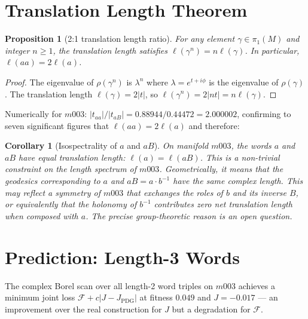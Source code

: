 \documentclass[floatfix,aps,prd,twocolumn,showpacs,superscriptaddress,longbibliography]{revtex4-2}
\newtheorem{proposition}{Proposition}
\newtheorem{corollary}{Corollary}
\begin{document}
\section{Translation Length Theorem}
\label{sec:length}

\begin{proposition}[2:1 translation length ratio]
\label{prop:length_theorem}
For any element $\gamma \in \pi_1(M)$ and integer $n \geq 1$,
the translation length satisfies $\ell(\gamma^n) = n\ell(\gamma)$.
In particular, $\ell(aa) = 2\ell(a)$.
\end{proposition}

\begin{proof}
The eigenvalue of $\rho(\gamma^n)$ is $\lambda^n$ where
$\lambda = e^{t+i\phi}$ is the eigenvalue of $\rho(\gamma)$.
The translation length $\ell(\gamma) = 2|t|$, so
$\ell(\gamma^n) = 2|nt| = n\ell(\gamma)$.
\end{proof}

Numerically for $m003$: $|t_{aa}|/|t_{aB}| = 0.88944/0.44472
= 2.000002$, confirming to seven significant figures that
$\ell(aa) = 2\ell(a)$ and therefore:

\begin{corollary}[Isospectrality of $a$ and $aB$]
\label{cor:isospectral}
On manifold $m003$, the words $a$ and $aB$ have equal
translation length: $\ell(a) = \ell(aB)$.
This is a non-trivial constraint on the length spectrum of $m003$.
Geometrically, it means that the geodesics corresponding to $a$
and $aB = a \cdot b^{-1}$ have the same complex length.
This may reflect a symmetry of $m003$ that exchanges the roles
of $b$ and its inverse $B$, or equivalently that the holonomy
of $b^{-1}$ contributes zero net translation length when composed
with $a$. The precise group-theoretic reason is an open question.
\end{corollary}

\section{Prediction: Length-3 Words}
\label{sec:prediction_scan}

The complex Borel scan over all length-2 word triples on $m003$
achieves a minimum joint loss $\mathcal{F} + c|J - J_{\mathrm{PDG}}|$
at fitness $0.049$ and $J = -0.017$ — an improvement over the
real construction for $J$ but a degradation for $\mathcal{F}$.
\end{document}
